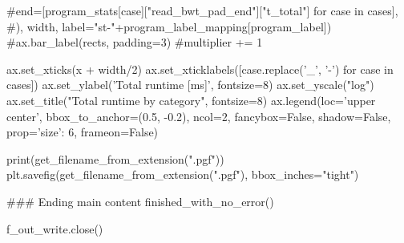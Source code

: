     #end=[program_stats[case]["read_bwt_pad_end"]["t_total"] for case in cases],
    #), width, label="st-"+program_label_mapping[program_label])
    #ax.bar_label(rects, padding=3)
    #multiplier += 1

ax.set_xticks(x + width/2)
ax.set_xticklabels([case.replace('_', '-') for case in cases])
ax.set_ylabel('Total runtime [ms]', fontsize=8)
ax.set_yscale("log")
ax.set_title("Total runtime by category", fontsize=8)
ax.legend(loc='upper center', bbox_to_anchor=(0.5, -0.2),
    ncol=2, fancybox=False, shadow=False, prop={'size': 6}, frameon=False)

print(get_filename_from_extension(".pgf"))
plt.savefig(get_filename_from_extension(".pgf"), bbox_inches="tight")




### Ending main content
finished_with_no_error()


f_out_write.close()




